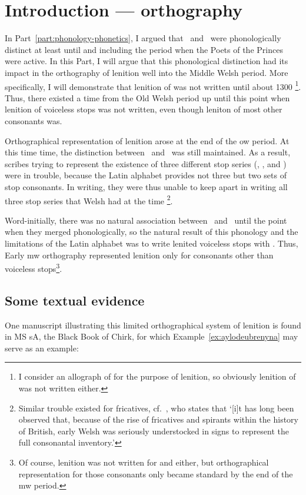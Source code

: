 \chapter{Introduction --- orthography}
\label{cha:intr-orth}

In Part~\ref{part:phonology-phonetics}, I argued that \lT\ and \xD\ were phonologically distinct at least until and including the period when the Poets of the Princes were active. In this Part, I will argue that this phonological distinction had its impact in the orthography of lenition well into the Middle Welsh period. More specifically, I will demonstrate that lenition of  was not written until about 1300%
\footnote{I consider  an allograph of  for the purpose of lenition, so obviously lenition of  was not written either.}.
Thus, there existed a time from the Old Welsh period up until this point when lenition of  voiceless stops was not written, even though leniton of most other consonants was.

Orthographical representation of lenition arose at the end of the \gls{ow} period. At this time time, the distinction between \lT\ and \xD\ was still maintained. As a result, scribes trying to represent the existence of three different stop series (\xT, \lT, and \xD) were in trouble, because the Latin alphabet  provides not three but two sets of stop consonants. In writing, they were thus unable to keep apart in writing all three stop series that Welsh had at the time%
\footnote{Similar trouble existed for fricatives, cf.\ \textcite[28]{russell_rowynniauc_2003}, who states that `[i]t has long been observed that, because of the rise of fricatives and spirants within the history of British, early Welsh was seriously understocked in signs to represent the full consonantal inventory.'}.

Word-initially, there was no natural association between \lT\ and \xD\ until the point when they merged phonologically, so the natural result of this phonology and the limitations of the Latin alphabet was to write lenited voiceless stops with . Thus, Early \gls{mw} orthography represented lenition only for consonants other than voiceless stops\footnote{Of course, lenition was not written for  and  either, but orthographical representation for those consonants only became standard by the end of the \gls{mw} period.}.


\section{Some textual evidence}
\label{sec:two-exampl-mowm}
One manuscript illustrating this limited orthographical system of lenition is found in MS \gls{sA}, the Black Book of Chirk, for which Example~\ref{ex:aylodeubrenyna} may serve as an example: 

